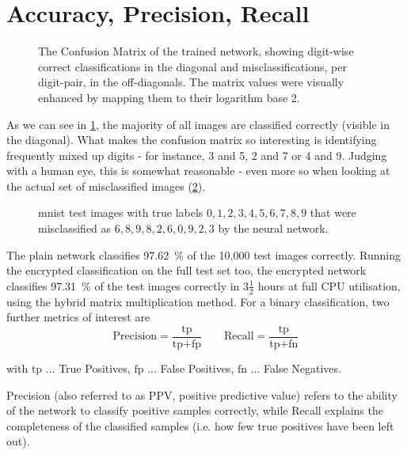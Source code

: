 \section{Accuracy, Precision, Recall}
\label{sec:accuracy-precision-recall}
\begin{figure}[H]
  \centering
  \caption[Confusion Matrix of the trained network]{
    The Confusion Matrix of the trained network, showing digit-wise correct classifications in the diagonal and misclassifications, per digit-pair, in the off-diagonals.
    The matrix values were visually enhanced by mapping them to their logarithm base 2.
  }
  \label{fig:confusion-matrix}
\end{figure}

As we can see in \cref{fig:confusion-matrix}, the majority of all images are classified correctly (visible in the diagonal).
What makes the confusion matrix so interesting is identifying frequently mixed up digits - for instance, 3 and 5, 2 and 7 or 4 and 9.
Judging with a human eye, this is somewhat reasonable - even more so when looking at the actual set of misclassified images (\cref{fig:misclassifications}).

\begin{figure}[H]
  \centering
  \caption[Misclassified images of the test set]{
    \gls{mnist} test images with true labels $0, 1, 2, 3, 4, 5, 6, 7, 8, 9$ that were misclassified as $6, 8, 9, 8, 2, 6, 0, 9, 2, 3$ by the neural network.
  }
  \label{fig:misclassifications}
\end{figure}

The plain network classifies \SI{97.62}{\percent} of the 10,000 test images correctly.
Running the encrypted classification on the full test set too, the encrypted network classifies \SI{97.31}{\percent} of the test images correctly in $3\frac{1}{2}$ hours at full CPU utilisation, using the hybrid matrix multiplication method.
For a binary classification, two further metrics of interest are
$$\text{Precision} = \frac{\text{tp}}{\text{tp} + \text{fp}} \quad\quad
  \text{Recall} = \frac{\text{tp}}{\text{tp} + \text{fn}}$$

with
$\text{tp}$ ... True Positives,
$\text{fp}$ ... False Positives,
$\text{fn}$ ... False Negatives.

Precision (also referred to as PPV, positive predictive value) refers to the ability of the network to classify positive samples correctly, while Recall explains the completeness of the classified samples (i.e. how few true positives have been left out).

